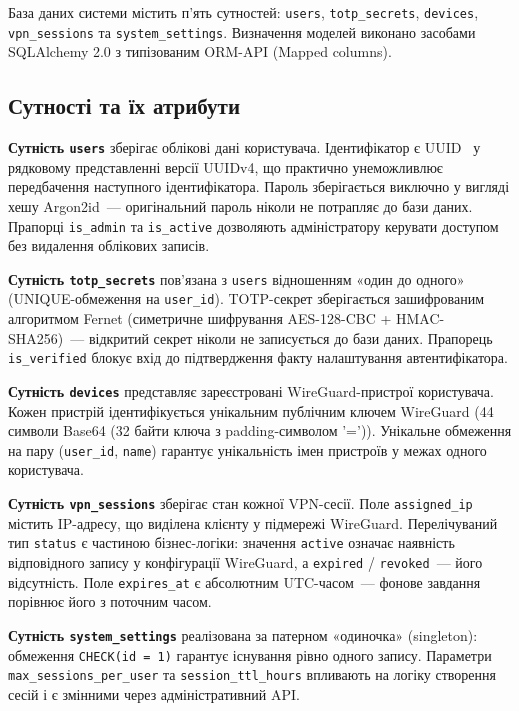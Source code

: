 База даних системи містить п'ять сутностей: \texttt{users},
\texttt{totp\_secrets}, \texttt{devices}, \texttt{vpn\_sessions}
та \texttt{system\_settings}. Визначення моделей виконано засобами
SQLAlchemy 2.0 з типізованим ORM-API (Mapped columns).

\subsection{Сутності та їх атрибути}

\textbf{Сутність \texttt{users}} зберігає облікові дані користувача.
Ідентифікатор є UUID~\cite{rfc4122} у рядковому представленні версії UUIDv4,
що практично унеможливлює передбачення наступного ідентифікатора.
Пароль зберігається виключно у вигляді хешу Argon2id~--- оригінальний
пароль ніколи не потрапляє до бази даних. Прапорці \texttt{is\_admin}
та \texttt{is\_active} дозволяють адміністратору керувати доступом
без видалення облікових записів.

\textbf{Сутність \texttt{totp\_secrets}} пов'язана з \texttt{users}
відношенням «один до одного» (UNIQUE-обмеження на \texttt{user\_id}).
TOTP-секрет зберігається зашифрованим алгоритмом Fernet (симетричне
шифрування AES-128-CBC + HMAC-SHA256)~--- відкритий секрет ніколи
не записується до бази даних. Прапорець \texttt{is\_verified}
блокує вхід до підтвердження факту налаштування автентифікатора.

\textbf{Сутність \texttt{devices}} представляє зареєстровані
WireGuard-пристрої користувача. Кожен пристрій ідентифікується
унікальним публічним ключем WireGuard (44 символи Base64 (32 байти ключа
з padding-символом '=')). Унікальне обмеження на пару (\texttt{user\_id},
\texttt{name}) гарантує унікальність імен пристроїв у межах
одного користувача.

\textbf{Сутність \texttt{vpn\_sessions}} зберігає стан кожної
VPN-сесії. Поле \texttt{assigned\_ip} містить IP-адресу, що
виділена клієнту у підмережі WireGuard. Перелічуваний тип
\texttt{status} є частиною бізнес-логіки: значення \texttt{active}
означає наявність відповідного запису у конфігурації WireGuard,
а \texttt{expired} / \texttt{revoked}~--- його відсутність.
Поле \texttt{expires\_at} є абсолютним UTC-часом~--- фонове завдання
порівнює його з поточним часом.

\textbf{Сутність \texttt{system\_settings}} реалізована за патерном
«одиночка» (singleton): обмеження \texttt{CHECK(id = 1)} гарантує
існування рівно одного запису. Параметри \texttt{max\_sessions\_per\_user}
та \texttt{session\_ttl\_hours} впливають на логіку створення сесій
і є змінними через адміністративний API.

